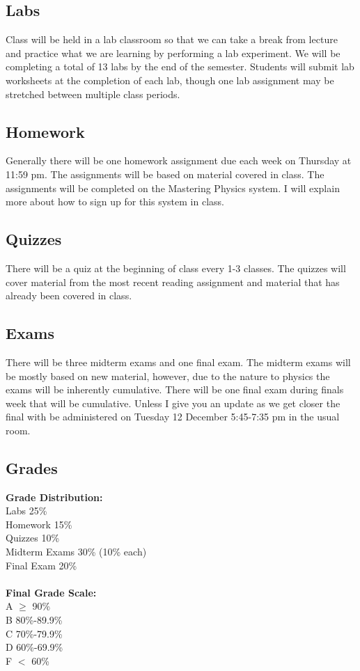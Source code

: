 \documentclass[12pt]{article}
\newcommand{\tabg}{3.5cm} %
\newcommand{\tabgg}{1.5cm} %
\begin{document}
\subsection*{Labs}
Class will be held in a lab classroom so that we can take a break from lecture and practice what we are learning by performing a lab experiment. We will be completing a total of 13 labs by the end of the semester. Students will submit lab worksheets at the completion of each lab, though one lab assignment may be stretched between multiple class periods.

\subsection*{Homework}
Generally there will be one homework assignment due each week on Thursday at 11:59 pm. The assignments will be based on material covered in class. The assignments will be completed on the Mastering Physics system. I will explain more about how to sign up for this system in class.

\subsection*{Quizzes}
There will be a quiz at the beginning of class every 1-3 classes. The quizzes will cover material from the most recent reading assignment and material that has already been covered in class.

\subsection*{Exams}
There will be three midterm exams and one final exam. The midterm exams will be mostly based on new material, however, due to the nature to physics the exams will be inherently cumulative. There will be one final exam during finals week that will be cumulative. Unless I give you an update as we get closer the final with be administered on Tuesday 12 December 5:45-7:35 pm in the usual room.

\subsection*{Grades}
\textbf{Grade Distribution:} \\
Labs \tabto{\tabg} 25\% \\
Homework \tabto{\tabg} 15\% \\
Quizzes \tabto{\tabg} 10\% \\
Midterm Exams \tabto{\tabg} 30\% (10\% each) \\
Final Exam \tabto{\tabg} 20\%
\\~\\
\textbf{Final Grade Scale:} \\
A \tabto{\tabgg} $\ge$ 90\% \\
B \tabto{\tabgg} 80\%-89.9\% \\
C \tabto{\tabgg} 70\%-79.9\% \\
D \tabto{\tabgg} 60\%-69.9\% \\
F \tabto{\tabgg} $<$ 60\%
\end{document}
